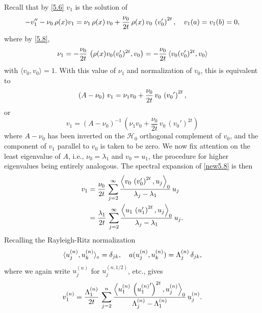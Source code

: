 \documentclass[final]{siamltex}
\numberwithin{equation}{section}
\begin{document}
Recall that by \eqref{5.6} $v_1$ is the solution of
\begin{equation} \notag
-v_1''-\nu_0\, \rho(x) v_1=\nu_1 \, \rho(x) \, v_0 +\frac{\nu_0}{2 t} \, \rho(x) \, v_0 \, \left(v_0'\right)^{2 t}, \quad v_1(a)=v_1(b)=0,
\end{equation}
where by \eqref{5.8},
\begin{equation} \notag
\nu_1= -\frac{\nu_0}{2 t} \, \left(\rho(x) v_0 (v_0')^{2t}, v_0\right)=  -\frac{\nu_0}{2 t} \, \langle
v_0 (v_0')^{2t}, v_0 \rangle
\end{equation}
with $\langle v_0, v_0 \rangle=1$. With this value of $\nu_1$ and normalization of $v_0$, this is equivalent to
\begin{equation} \notag
\left(A-\nu_0\right) \, v_1= \nu_1 v_0+ \frac{\nu_0}{2 t} \, v_0 \, \left({v_0}'\right)^{2t},
\end{equation}
or
\begin{equation} \label{new5.8}
v_1= \left(A-\nu_0\right)^{-1} \, \left(\nu_1 v_0+ \frac{\nu_0}{2 t} \, v_0 \, \left({v_0}'\right)^{2t}\right)
\end{equation}
where $A-\nu_0$ has been inverted on the $\mathcal{H}_0$ orthogonal complement of $v_0$, and the component of $v_1$ parallel to $v_0$ is taken to be zero. We now fix attention on the least eigenvalue of $A$, i.e., $\nu_0=\lambda_1$ and $v_0=u_1$, the procedure for higher eigenvalues being entirely analogous. The spectral expansion of \eqref{new5.8} is then
\begin{align} \notag
v_1 &= \frac{\nu_0}{2t} \, \sum_{j=2}^{\infty} \frac{\Big \langle v_0 \, \left(v_0'\right)^{2t}, u_j \Big \rangle_0}{\lambda_j - \lambda_1} \, u_j \notag \\
&= \frac{\lambda_1}{2t} \, \sum_{j=2}^{\infty} \frac{\Big \langle u_1 \, \left(u_1'\right)^{2t}, u_j\Big \rangle_0 }{\lambda_j - \lambda_1}\, u_j.
\end{align}
Recalling the Rayleigh-Ritz normalization
\begin{equation}
\langle u_j^{(n)}, u_k^{(n)}\rangle_{{}_{0}} =\delta_{jk}, \quad   a( u_j^{(n)}, u_k^{(n)}) =\Lambda_j^{(n)} \, \delta_{jk}, \notag
\end{equation}
where we again write $u_j^{(n)}$ for $u_j^{(n,1/2)}$, etc., gives
\begin{equation} \notag
v_1^{(n)}= \frac{\Lambda_1^{(n)}}{2t} \, \sum_{j=2}^{n} \frac{\Big \langle u_1^{(n)} \, \left({u_1^{(n)}}'\right)^{2t}, {u_j^{(n)}} \Big \rangle_0}{\Lambda_j^{(n)} - \Lambda_1^{(n)}} \, u_j^{(n)}.
\end{equation}
\end{document}
